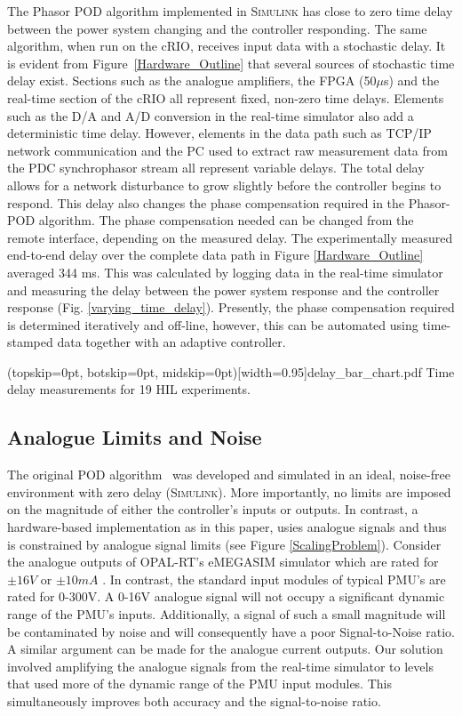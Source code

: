 \documentclass{ieeeaccess}
\begin{document}
The Phasor POD algorithm implemented in \textsc{Simulink} has close to zero time delay between the power system changing and the controller responding. The same algorithm, when run on the cRIO, receives input data with a stochastic delay. It is evident from Figure~\ref{Hardware_Outline} that several sources of stochastic time delay exist. Sections such as the analogue amplifiers, the FPGA (50$\mu$s) and the real-time section of the cRIO all represent fixed, non-zero time delays. Elements such as the D/A and A/D conversion in the real-time simulator also add a deterministic time delay. However, elements in the data path such as TCP/IP network communication and the PC used to extract raw measurement data from the PDC synchrophasor stream all represent variable delays. The total delay allows for a network disturbance to grow slightly before the controller begins to respond. This delay also changes the phase compensation required in the Phasor-POD algorithm. The phase compensation needed can be changed from the remote interface, depending on the measured delay. The experimentally measured end-to-end delay over the complete data path in Figure \ref{Hardware_Outline} averaged 344 ms. This was calculated by logging data in the real-time simulator and measuring the delay between the power system response and the controller response (Fig. \ref{varying_time_delay}). Presently, the phase compensation required is determined iteratively and off-line, however, this can be automated using time-stamped data together with an adaptive controller.

\Figure[tbp!](topskip=0pt, botskip=0pt, midskip=0pt)[width=0.95\columnwidth]{delay_bar_chart.pdf}
{Time delay measurements for 19 HIL experiments.\label{varying_time_delay}}


\subsection{Analogue Limits and Noise}
The original POD algorithm~\cite{PhasorPOD} was developed and simulated in an ideal, noise-free environment with zero delay (\textsc{Simulink}). More importantly, no limits are imposed on the magnitude of either the controller's inputs or outputs. In contrast, a hardware-based implementation as in this paper, usies analogue signals and thus is constrained by analogue signal limits (see Figure \ref{ScalingProblem}). Consider the analogue outputs of OPAL-RT's eMEGASIM simulator which are rated for $\pm16V$ or $\pm10mA$  \cite{eMEGASIM}. In contrast, the standard input modules of typical PMU's are rated for 0-300V. A 0-16V analogue signal will not occupy a significant dynamic range of the PMU\rq{}s inputs. Additionally, a signal of such a small magnitude will be contaminated by noise and will consequently have a poor Signal-to-Noise ratio. A similar argument can be made for the analogue current outputs. Our solution involved amplifying the analogue signals from the real-time simulator to levels that used more of the dynamic range of the PMU input modules. This simultaneously improves both accuracy and the signal-to-noise ratio.
\end{document}
